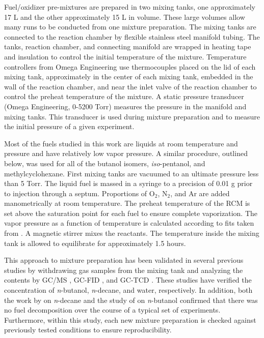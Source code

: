 \documentclass[12pt, letterpaper]{article}
\begin{document}
Fuel/oxidizer pre-mixtures are prepared in two mixing tanks, one approximately
17 L and the other approximately 15 L in volume. These large volumes allow many
runs to be conducted from one mixture preparation. The mixing tanks are connected
to the reaction chamber by flexible stainless steel manifold tubing. The tanks, reaction chamber,
and connecting manifold are wrapped in heating tape and insulation to control the initial
temperature of the mixture. Temperature controllers from Omega Engineering use thermocouples
placed on the lid of each mixing tank, approximately in the center of each mixing tank, embedded in
the wall of the reaction chamber, and near the inlet valve of the reaction chamber to control the
preheat temperature of the mixture. A static pressure transducer (Omega Engineering, 0-5200 Torr)
measures the pressure in the manifold and mixing tanks. This transducer is used
during mixture preparation and to measure the initial pressure of a given experiment.

Most of the fuels studied in this work are liquids at room temperature and
pressure and have relatively low vapor pressure. A similar procedure, outlined
below, was used for all of the butanol isomers, \textit{iso}-pentanol, and
methylcyclohexane. First mixing tanks are vacuumed to an ultimate pressure
less than 5 Torr. The liquid fuel is massed in a syringe to a precision of
0.01 g prior to injection through a septum. Proportions of O$_2$, N$_2$, and
Ar are added manometrically at room temperature. The preheat temperature of
the RCM is set above the saturation point for each fuel to ensure complete
vaporization. The vapor pressure as a function of temperature is calculated
according to fits taken from \textcite{Yaws1999}. A magnetic stirrer mixes
the reactants. The temperature inside the mixing tank is allowed to
equilibrate for approximately 1.5 hours.

This approach to mixture preparation has been validated in several previous
studies by withdrawing gas samples from the mixing tank and analyzing the
contents by GC/MS \cite{Weber2011}, GC-FID \cite{Kumar2009}, and GC-TCD
\cite{Das2012}. These studies have verified the concentration of
\textit{n}-butanol, \textit{n}-decane, and water, respectively. In addition,
both the work by \textcite{Kumar2009} on \textit{n}-decane and the study of
\textcite{Weber2011} on \textit{n}-butanol confirmed that there was no fuel
decomposition over the course of a typical set of experiments. Furthermore,
within this study, each new mixture preparation is checked against previously
tested conditions to ensure reproducibility.
\end{document}
